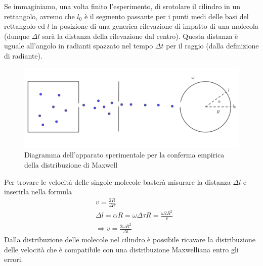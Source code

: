 \documentclass[
10pt, %
a4paper, %
oneside, %
headinclude,footinclude, %
BCOR5mm, %
]{scrartcl}
\begin{document}
Se immaginiamo, una volta finito l'esperimento, di srotolare il cilindro in un rettangolo, avremo che $l_0$ è il segmento passante per i punti medi delle basi del rettangolo ed $l$ la posizione di una generica rilevazione di impatto di una molecola (dunque $\Delta l$ sarà la distanza della rilevazione dal centro).  Questa distanza è uguale all'angolo in radianti spazzato nel tempo $\Delta t$ per il raggio (dalla definizione di radiante).
\begin{figure}[h!]
	\centering
	\includegraphics[width=0.9\linewidth]{../images/Esperimento_Maxwell}
	\caption{Diagramma dell'apparato sperimentale per la conferma empirica della distribuzione di Maxwell}
	\label{fig:esperimentomaxwell}
\end{figure}
\FloatBarrier
Per trovare le velocità delle singole molecole basterà misurare la distanza $\Delta l$ e inserirla nella formula
\begin{align*} 
	&v =\frac{2 R}{\Delta\tau}\\
	&\Delta l = \alpha R = \omega \Delta\tau R = \frac{\omega 2 R^2}{v}\\
	&\Rightarrow v = \frac{2\omega R^2}{\Delta l}
\end{align*} 
Dalla distribuzione delle molecole nel cilindro è possibile ricavare la distribuzione delle velocità che è compatibile con una distribuzione Maxwelliana entro gli errori.
\end{document}
